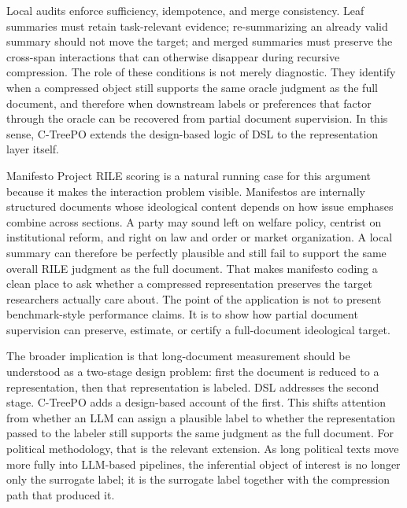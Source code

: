 \documentclass[11pt]{article}
\begin{document}
Local audits enforce sufficiency, idempotence, and merge consistency. Leaf summaries must retain task-relevant evidence; re-summarizing an already valid summary should not move the target; and merged summaries must preserve the cross-span interactions that can otherwise disappear during recursive compression. The role of these conditions is not merely diagnostic. They identify when a compressed object still supports the same oracle judgment as the full document, and therefore when downstream labels or preferences that factor through the oracle can be recovered from partial document supervision. In this sense, C-TreePO extends the design-based logic of DSL to the representation layer itself.

Manifesto Project RILE scoring is a natural running case for this argument because it makes the interaction problem visible. Manifestos are internally structured documents whose ideological content depends on how issue emphases combine across sections. A party may sound left on welfare policy, centrist on institutional reform, and right on law and order or market organization. A local summary can therefore be perfectly plausible and still fail to support the same overall RILE judgment as the full document. That makes manifesto coding a clean place to ask whether a compressed representation preserves the target researchers actually care about. The point of the application is not to present benchmark-style performance claims. It is to show how partial document supervision can preserve, estimate, or certify a full-document ideological target.

The broader implication is that long-document measurement should be understood as a two-stage design problem: first the document is reduced to a representation, then that representation is labeled. DSL addresses the second stage. C-TreePO adds a design-based account of the first. This shifts attention from whether an LLM can assign a plausible label to whether the representation passed to the labeler still supports the same judgment as the full document. For political methodology, that is the relevant extension. As long political texts move more fully into LLM-based pipelines, the inferential object of interest is no longer only the surrogate label; it is the surrogate label together with the compression path that produced it.

\clearpage


\end{document}
